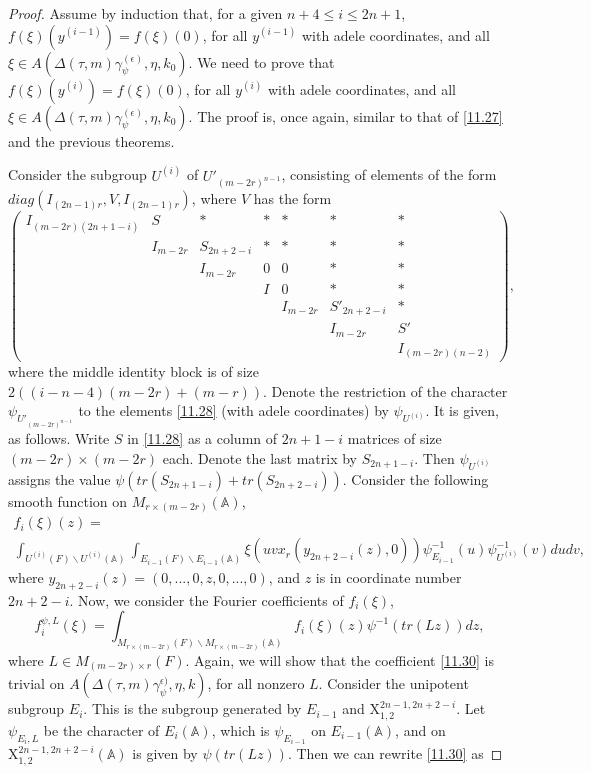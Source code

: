 \documentclass[12pts]{amsart}
\newcommand{\BA}{{\mathbb {A}}}
\begin{document}
\begin{proof}
 Assume by induction that, for a given $n+4\leq i\leq 2n+1$, $f(\xi)(y^{(i-1)})=f(\xi)(0)$, for all $y^{(i-1)}$ with adele coordinates, and all $\xi\in A(\Delta(\tau,m)\gamma_\psi^{(\epsilon)},\eta,k_0)$. We need to prove that $f(\xi)(y^{(i)})=f(\xi)(0)$, for all $y^{(i)}$ with adele coordinates, and all $\xi\in A(\Delta(\tau,m)\gamma_\psi^{(\epsilon)},\eta,k_0)$. The proof  is, once again, similar to that of \eqref{11.27} and the previous theorems.
 
 Consider the subgroup  $U^{(i)}$ of $U'_{(m-2r)^{n-1}}$, consisting of elements of the form $diag(I_{(2n-1)r},V, I_{(2n-1)r})$, where $V$ has the form
\begin{equation}\label{11.28}
\begin{pmatrix}I_{(m-2r)(2n+1-i)}&S&\ast&\ast&\ast&\ast&\ast\\
&I_{m-2r}&S_{2n+2-i}&\ast&\ast&\ast&\ast\\&&I_{m-2r}&0&0&\ast&\ast\\&&&I&0&\ast&\ast\\&&&&I_{m-2r}&S'_{2n+2-i}&\ast\\&&&&&I_{m-2r}&S'\\&&&&&&I_{(m-2r)(n-2)}\end{pmatrix},
\end{equation}
where the middle identity block is of size $2((i-n-4)(m-2r)+(m-r))$. Denote the restriction of the character $\psi_{U'_{(m-2r)^{n-1}}}$ to the elements \eqref{11.28} (with adele coordinates) by $\psi_{U^{(i)}}$. It is given, as follows. Write $S$ in \eqref{11.28} as a column of $2n+1-i$ matrices of size $(m-2r)\times (m-2r)$ each. Denote the last matrix by $S_{2n+1-i}$. Then $\psi_{U^{(i)}}$ assigns the value $\psi(tr(S_{2n+1-i})+tr(S_{2n+2-i}))$.  Consider the following
smooth function on $M_{r\times (m-2r)}(\BA)$,
\begin{multline}\label{11.29}
 f_i(\xi)(z)=\\
\int_{U^{(i)}(F)\backslash
	U^{(i)}(\BA)}\int_{E_{i-1}(F)\backslash E_{i-1}(\BA)}\xi(uvx_r(y_{2n+2-i}(z),0))\psi^{-1}_{E_{i-1}}(u)\psi^{-1}_{U^{(i)}}(v)dudv,
\end{multline}
where $y_{2n+2-i}(z)=(0,...,0,z,0,...,0)$, and $z$ is in coordinate number $2n+2-i$. Now, we consider the Fourier coefficients of $f_i(\xi)$,  
\begin{equation}\label{11.30}
f_{i}^{\psi,L}(\xi)=\int_{M_{r\times (m-2r)}(F)\backslash M_{r\times (m-2r)}(\BA)}f_{i}(\xi)(z)\psi^{-1}(tr(Lz))dz,
\end{equation}
where $L\in M_{(m-2r)\times r}(F)$. Again, we will show that the coefficient \eqref{11.30} is trivial on $A(\Delta(\tau,m)\gamma_\psi^{\epsilon)},\eta,k)$, for all nonzero $L$. Consider the unipotent subgroup $E_i$. This is the subgroup generated by $E_{i-1}$ and $\mathrm{X}_{1,2}^{2n-1,2n+2-i}$. Let $\psi_{E_i,L}$ be the character of $E_i(\BA)$, which is $\psi_{E_{i-1}}$ on $E_{i-1}(\BA)$, and on $\mathrm{X}_{1,2}^{2n-1,2n+2-i}(\BA)$ is given by $\psi(tr(Lz))$. Then we can rewrite \eqref{11.30} as

\end{proof}
\end{document}
